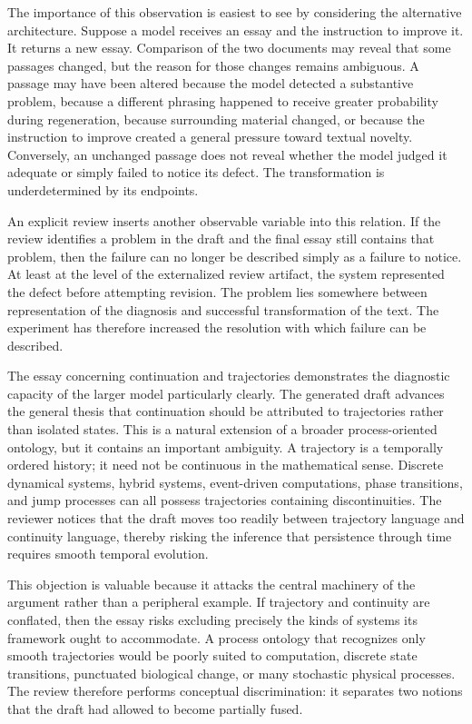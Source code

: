 \documentclass[11pt]{article}
\begin{document}
The importance of this observation is easiest to see by considering the alternative architecture. Suppose a model receives an essay and the instruction to improve it. It returns a new essay. Comparison of the two documents may reveal that some passages changed, but the reason for those changes remains ambiguous. A passage may have been altered because the model detected a substantive problem, because a different phrasing happened to receive greater probability during regeneration, because surrounding material changed, or because the instruction to improve created a general pressure toward textual novelty. Conversely, an unchanged passage does not reveal whether the model judged it adequate or simply failed to notice its defect. The transformation is underdetermined by its endpoints.

An explicit review inserts another observable variable into this relation. If the review identifies a problem in the draft and the final essay still contains that problem, then the failure can no longer be described simply as a failure to notice. At least at the level of the externalized review artifact, the system represented the defect before attempting revision. The problem lies somewhere between representation of the diagnosis and successful transformation of the text. The experiment has therefore increased the resolution with which failure can be described.

The essay concerning continuation and trajectories demonstrates the diagnostic capacity of the larger model particularly clearly. The generated draft advances the general thesis that continuation should be attributed to trajectories rather than isolated states. This is a natural extension of a broader process-oriented ontology, but it contains an important ambiguity. A trajectory is a temporally ordered history; it need not be continuous in the mathematical sense. Discrete dynamical systems, hybrid systems, event-driven computations, phase transitions, and jump processes can all possess trajectories containing discontinuities. The reviewer notices that the draft moves too readily between trajectory language and continuity language, thereby risking the inference that persistence through time requires smooth temporal evolution.

This objection is valuable because it attacks the central machinery of the argument rather than a peripheral example. If trajectory and continuity are conflated, then the essay risks excluding precisely the kinds of systems its framework ought to accommodate. A process ontology that recognizes only smooth trajectories would be poorly suited to computation, discrete state transitions, punctuated biological change, or many stochastic physical processes. The review therefore performs conceptual discrimination: it separates two notions that the draft had allowed to become partially fused.
\end{document}

